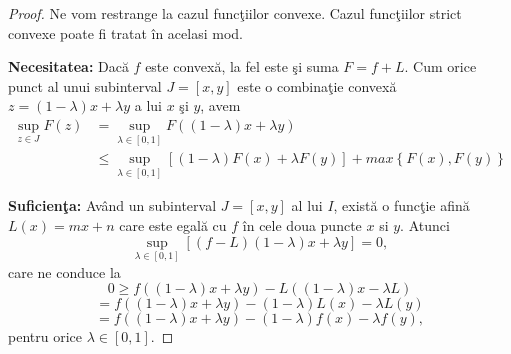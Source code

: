 \documentclass[a4paper,12pt,oneside]{report}
\begin{document}
\begin{proof}
Ne vom restrange la cazul func\c{t}iilor convexe. Cazul func\c{t}iilor strict convexe poate fi tratat \^{i}n acelasi mod.

\textbf{Necesitatea:} Dac\u{a} \(f\) este convex\u{a}, la fel este \c{s}i suma \(F = f + L\). Cum orice punct al unui subinterval \(J = \left [ x , y \right ]\) este o combina\c{t}ie convex\u{a} \(z = \left ( 1 - \lambda  \right )x + \lambda y \) a lui \(x\) \c{s}i \(y\), avem
\begin{equation*}
\begin{split}
  \sup_{z\in J}F\left ( z \right ) &= \sup_{\lambda \in \left [ 0 , 1 \right ]}F\left ( \left ( 1 - \lambda  \right )x + \lambda y \right )\\
  &\leq \sup_{\lambda \in \left [ 0,1 \right ]}\left [ \left ( 1-\lambda  \right )F\left ( x \right ) + \lambda F\left ( y \right ) \right ] + max \left \{ F\left ( x \right ), F\left ( y \right ) \right \}
  \end{split}
\end{equation*}

\textbf{Suficien\c{t}a:} Av\^{a}nd un subinterval \(J = \left [ x,y \right ]\) al lui \(I\), exist\u{a} o func\c{t}ie afin\u{a} \(L\left ( x \right ) = mx + n\) care este egal\u{a} cu \(f\) \^{i}n cele doua puncte  \(x\) si \(y\).
Atunci
\begin{displaymath}
  \sup_{\lambda \in \left [ 0,1 \right ]}\left [ \left ( f - L \right )\left ( 1 - \lambda  \right )x + \lambda y \right ] = 0,
\end{displaymath}
care ne conduce la
\begin{displaymath}
  0\geq f\left ( \left ( 1 - \lambda  \right )x + \lambda y \right )- L\left ( \left ( 1 - \lambda  \right )x - \lambda L \right )
\end{displaymath}
  \begin{displaymath}
  = f\left ( \left ( 1 - \lambda  \right )x + \lambda y  \right ) - \left ( 1 - \lambda  \right )L\left ( x \right ) - \lambda L\left ( y \right )
\end{displaymath}
\begin{displaymath}
  = f\left ( \left ( 1 - \lambda  \right )x + \lambda y \right ) - \left ( 1 - \lambda  \right ) f\left ( x \right ) - \lambda f \left ( y \right ),
\end{displaymath}
pentru orice \(\lambda \in \left [ 0,1 \right ]\).
\end{proof}
\end{document}
